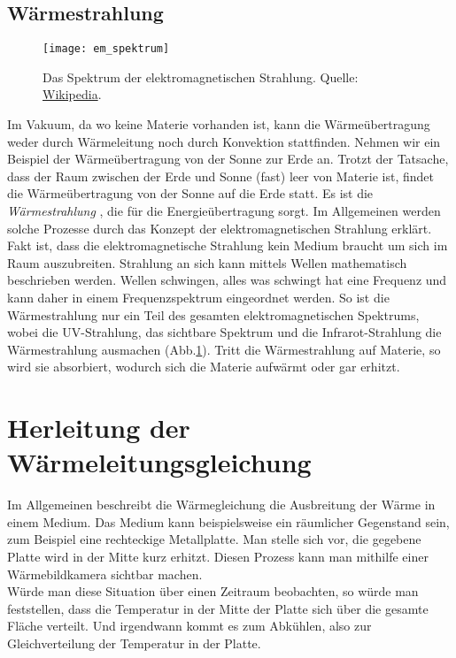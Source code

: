 \subsection{Wärmestrahlung}

\begin{figure}[!h]
	\centering
	\texttt{[image: em\_spektrum]}
	\caption{Das Spektrum der elektromagnetischen Strahlung. Quelle: \href{https://de.wikipedia.org/wiki/Elektromagnetisches_Spektrum}{Wikipedia}.}
	\label{fig:1.1.3_1}
\end{figure}

Im Vakuum, da wo keine Materie vorhanden ist, kann die Wärmeübertragung weder durch Wärmeleitung noch durch Konvektion stattfinden. Nehmen wir ein Beispiel der Wärmeübertragung von der Sonne zur Erde an. Trotzt der Tatsache, dass der Raum zwischen der Erde und Sonne (fast) leer von Materie ist, findet die Wärmeübertragung von der Sonne auf die Erde statt. Es ist die \textit{Wärmestrahlung }, die für die Energieübertragung sorgt. Im Allgemeinen werden solche Prozesse durch das Konzept der elektromagnetischen Strahlung erklärt. Fakt ist, dass die elektromagnetische Strahlung kein Medium braucht um sich im Raum auszubreiten. Strahlung an sich kann mittels Wellen mathematisch beschrieben werden. Wellen schwingen, alles was schwingt hat eine Frequenz und kann daher in einem Frequenzspektrum eingeordnet werden. So ist die Wärmestrahlung nur ein Teil des gesamten elektromagnetischen Spektrums, wobei die UV-Strahlung, das sichtbare Spektrum und die Infrarot-Strahlung die Wärmestrahlung ausmachen (Abb.\ref{fig:1.1.3_1}). Tritt die Wärmestrahlung auf Materie, so wird sie absorbiert, wodurch sich die Materie aufwärmt oder gar erhitzt.


\section{Herleitung der Wärmeleitungsgleichung}

Im Allgemeinen beschreibt die Wärmegleichung die Ausbreitung der Wärme in einem Medium. Das Medium kann beispielsweise ein räumlicher Gegenstand sein, zum Beispiel eine rechteckige Metallplatte. Man stelle sich vor, die gegebene Platte wird in der Mitte kurz erhitzt. Diesen Prozess kann man mithilfe einer Wärmebildkamera sichtbar machen.\\

Würde man diese Situation über einen Zeitraum beobachten, so würde man feststellen, dass die Temperatur in der Mitte der Platte sich über die gesamte Fläche verteilt. Und irgendwann kommt es zum Abkühlen, also zur Gleichverteilung der Temperatur in der Platte.\\

